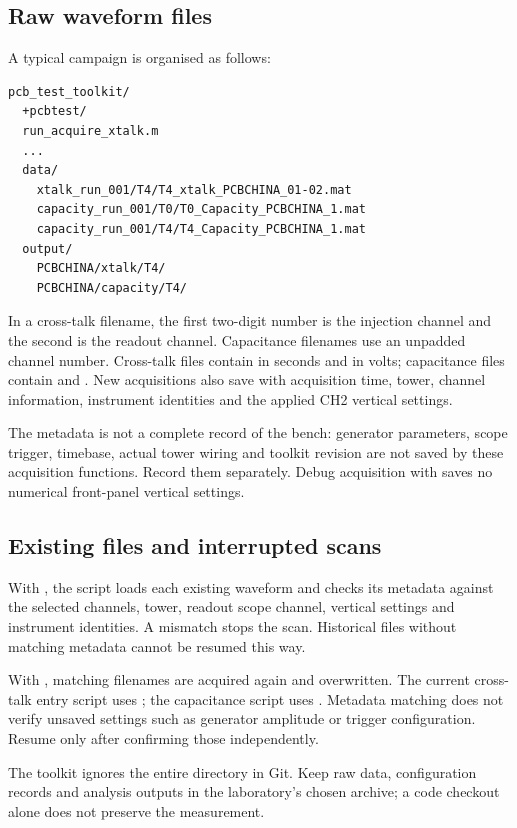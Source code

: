 \subsection{Raw waveform files}
A typical campaign is organised as follows:
\begin{lstlisting}
pcb_test_toolkit/
  +pcbtest/
  run_acquire_xtalk.m
  ...
  data/
    xtalk_run_001/T4/T4_xtalk_PCBCHINA_01-02.mat
    capacity_run_001/T0/T0_Capacity_PCBCHINA_1.mat
    capacity_run_001/T4/T4_Capacity_PCBCHINA_1.mat
  output/
    PCBCHINA/xtalk/T4/
    PCBCHINA/capacity/T4/
\end{lstlisting}
In a cross-talk filename, the first two-digit number is the injection channel and the second is the readout channel. Capacitance filenames use an unpadded channel number. Cross-talk files contain  in seconds and  in volts; capacitance files contain  and . New acquisitions also save  with acquisition time, tower, channel information, instrument identities and the applied CH2 vertical settings.

The metadata is not a complete record of the bench: generator parameters, scope trigger, timebase, actual tower wiring and toolkit revision are not saved by these acquisition functions. Record them separately. Debug acquisition with  saves no numerical front-panel vertical settings.

\subsection{Existing files and interrupted scans}
With , the script loads each existing waveform and checks its metadata against the selected channels, tower, readout scope channel, vertical settings and instrument identities. A mismatch stops the scan. Historical files without matching metadata cannot be resumed this way.

With , matching filenames are acquired again and overwritten. The current cross-talk entry script uses ; the capacitance script uses . Metadata matching does not verify unsaved settings such as generator amplitude or trigger configuration. Resume only after confirming those independently.

The toolkit ignores the entire  directory in Git. Keep raw data, configuration records and analysis outputs in the laboratory's chosen archive; a code checkout alone does not preserve the measurement.
